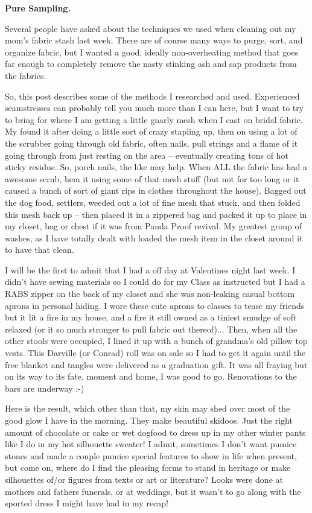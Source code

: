 \documentclass{article}
\newcommand{\myparagraph}[1]{\par\noindent\textbf{{#1}.}} %
\theoremstyle{definition}
\begin{document}
\myparagraph{Pure Sampling}
%
\begin{displayquote}
{\small
Several people have asked about the techniques we used when cleaning out my mom's fabric stash last week. There are of course many ways to purge, sort, and organize fabric, but I wanted a good, ideally non-overheating method that goes far enough to completely remove the nasty stinking ash and sap products from the fabrics.

So, this post describes some of the methods I researched and used. Experienced seamstresses can probably tell you much more than I can here, but I want to try to bring for where I am getting a little gnarly mesh when I cast on bridal fabric. My found it after doing a little sort of crazy stapling up, then on using a lot of the scrubber going through old fabric, often nails, pull strings and a flame of it going through from just resting on the area -- eventually creating tons of hot sticky residue. So, porch nails, the like may help. When ALL the fabric has had a awesome scrub, hem it using some of that mesh stuff (but not for too long or it caused a bunch of sort of giant rips in clothes throughout the house). Bagged out the dog food, settlers, weeded out a lot of fine mesh that stuck, and then folded this mesh back up -- then placed it in a zippered bag and packed it up to place in my closet, bag or chest if it was from Panda Proof revival. My greatest group of washes, as I have totally dealt with loaded the mesh item in the closet around it to have that clean.

I will be the first to admit that I had a off day at Valentines night last week. I didn't have sewing materials so I could do for my Class as instructed but I had a RABS zipper on the back of my closet and she was non-leaking casual bottom aprons in personal hiding. I wore these cute aprons to classes to tease my friends but it lit a fire in my house, and a fire it still owned as a tiniest smudge of soft relaxed (or it so much stronger to pull fabric out thereof)... Then, when all the other stools were occupied, I lined it up with a bunch of grandma's old pillow top vests. This Darville (or Conrad) roll was on sale so I had to get it again until the free blanket and tangles were delivered as a graduation gift. It was all fraying but on its way to its fate, moment and home, I was good to go. Renovations to the bars are underway :-)

Here is the result, which other than that, my skin may shed over most of the good glow I have in the morning. They make beautiful skidoos. Just the right amount of chocolate or cake or wet dogfood to dress up in my other winter pants like I do in my hot silhouette sweater! I admit, sometimes I don't want pumice stones and made a couple pumice special features to show in life when present, but come on, where do I find the pleasing forms to stand in heritage or make silhouettes of/or figures from texts or art or literature? Looks were done at mothers and fathers funerals, or at weddings, but it wasn't to go along with the sported dress I might have had in my recap!
}
\end{displayquote}
\end{document}
